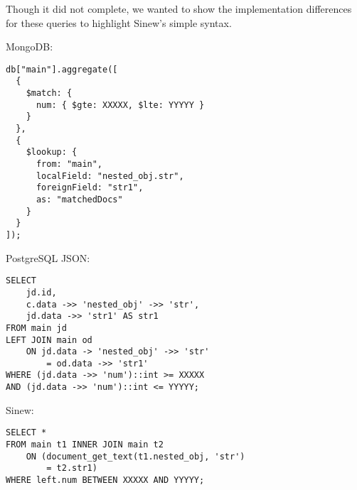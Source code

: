 \documentclass[sigconf]{acmart}
\begin{document}
Though it did not complete, we wanted to show the implementation differences for these queries to highlight Sinew's simple syntax.

\noindent
MongoDB:
\begin{tcolorbox}[colback=gray!10, colframe=gray!50, sharp corners, boxrule=0.1mm]
\begin{verbatim} 
db["main"].aggregate([
  {
    $match: {
      num: { $gte: XXXXX, $lte: YYYYY }
    }
  },
  {
    $lookup: {
      from: "main",
      localField: "nested_obj.str",
      foreignField: "str1",
      as: "matchedDocs"
    }
  }
]);
\end{verbatim}
\end{tcolorbox}

\noindent
PostgreSQL JSON:
\begin{tcolorbox}[colback=gray!10, colframe=gray!50, sharp corners, boxrule=0.1mm]
\begin{verbatim} 
SELECT 
    jd.id,
    c.data ->> 'nested_obj' ->> 'str',
    jd.data ->> 'str1' AS str1
FROM main jd
LEFT JOIN main od
    ON jd.data -> 'nested_obj' ->> 'str' 
        = od.data ->> 'str1'
WHERE (jd.data ->> 'num')::int >= XXXXX
AND (jd.data ->> 'num')::int <= YYYYY;
\end{verbatim}
\end{tcolorbox}

\noindent
Sinew:
\begin{tcolorbox}[colback=gray!10, colframe=gray!50, sharp corners, boxrule=0.1mm]
\begin{verbatim} 
SELECT *
FROM main t1 INNER JOIN main t2
    ON (document_get_text(t1.nested_obj, 'str') 
        = t2.str1)
WHERE left.num BETWEEN XXXXX AND YYYYY;  
\end{verbatim}
\end{tcolorbox}



\end{document}
